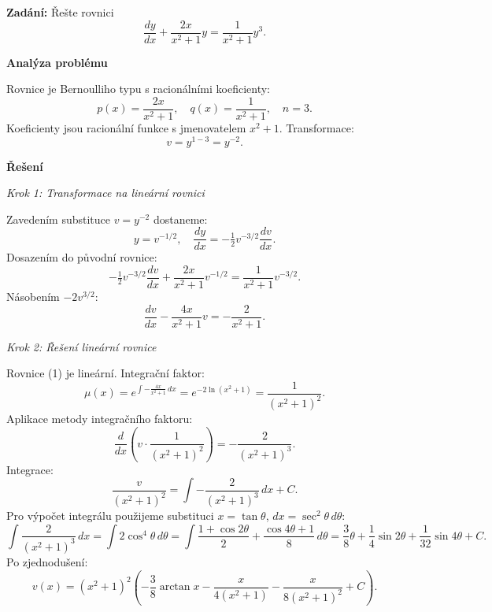 \begin{example}
    \label{ex:a3-stredni-racionalni}
    
    \noindent\textbf{Zadání:} Řešte rovnici
    \[
    \frac{dy}{dx} + \frac{2x}{x^2 + 1}y = \frac{1}{x^2 + 1} y^3.
    \]
    
    \vspace{1.5\baselineskip}
    
    \noindent\textbf{Analýza problému}
    
    \noindent Rovnice je Bernoulliho typu s racionálními koeficienty:
    \[
    p(x) = \frac{2x}{x^2 + 1}, \quad q(x) = \frac{1}{x^2 + 1}, \quad n = 3.
    \]
    Koeficienty jsou racionální funkce s jmenovatelem $x^2 + 1$. Transformace:
    \[
    v = y^{1-3} = y^{-2}.
    \]
    
    \vspace{1.5\baselineskip}
    
    \noindent\textbf{Řešení}
    
    \noindent\textit{Krok 1: Transformace na lineární rovnici}
    
    Zavedením substituce $v = y^{-2}$ dostaneme:
    \[
    y = v^{-1/2}, \quad \frac{dy}{dx} = -\tfrac{1}{2}v^{-3/2}\frac{dv}{dx}.
    \]
    Dosazením do původní rovnice:
    \[
    -\tfrac{1}{2}v^{-3/2}\frac{dv}{dx} + \frac{2x}{x^2 + 1}v^{-1/2} = \frac{1}{x^2 + 1} v^{-3/2}.
    \]
    Násobením $-2v^{3/2}$:
    \[
    \frac{dv}{dx} - \frac{4x}{x^2 + 1}v = -\frac{2}{x^2 + 1}. \tag{1}
    \]
    
    \vspace{1\baselineskip}
    
    \noindent\textit{Krok 2: Řešení lineární rovnice}
    
    Rovnice (1) je lineární. Integrační faktor:
    \[
    \mu(x) = e^{\int -\frac{4x}{x^2 + 1}\,dx} = e^{-2\ln(x^2 + 1)} = \frac{1}{(x^2 + 1)^2}.
    \]
    Aplikace metody integračního faktoru:
    \[
    \frac{d}{dx}\left(v \cdot \frac{1}{(x^2 + 1)^2}\right) = -\frac{2}{(x^2 + 1)^3}.
    \]
    Integrace:
    \[
    \frac{v}{(x^2 + 1)^2} = \int -\frac{2}{(x^2 + 1)^3}\,dx + C.
    \]
    Pro výpočet integrálu použijeme substituci $x = \tan\theta$, $dx = \sec^2\theta\,d\theta$:
    \[
    \int \frac{2}{(x^2 + 1)^3}\,dx = \int 2\cos^4\theta\,d\theta = \int \frac{1 + \cos 2\theta}{2} + \frac{\cos 4\theta + 1}{8}\,d\theta = \frac{3}{8}\theta + \frac{1}{4}\sin 2\theta + \frac{1}{32}\sin 4\theta + C.
    \]
    Po zjednodušení:
    \[
    v(x) = (x^2 + 1)^2 \left( -\frac{3}{8}\arctan x - \frac{x}{4(x^2 + 1)} - \frac{x}{8(x^2 + 1)^2} + C \right). \tag{2}
    \]
    

\end{example}
